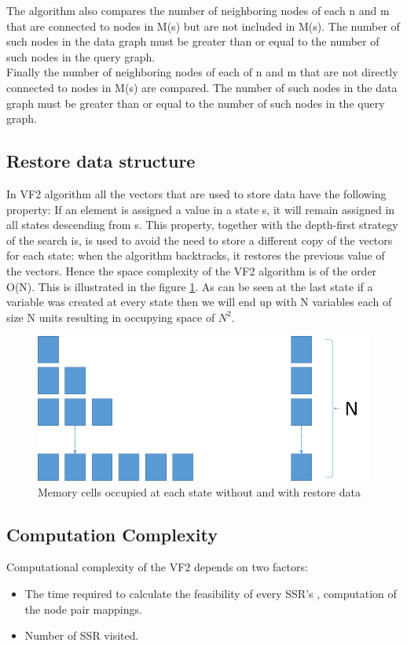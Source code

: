 The algorithm also compares the number of neighboring nodes of each n and m that are connected to nodes in M(s) but are not
included in M(s). The number of such nodes in the data graph must be greater than or equal to the number of such nodes in the query graph.\\

Finally the number of neighboring nodes of each of n and m that are not directly connected to nodes in M(s) are compared. The number of 
such nodes in the data graph must be greater than or equal to the number of such nodes in the query graph.

\subsection{Restore data structure}
In VF2 algorithm all the vectors that are used to store data have the following property: If an element is assigned a value in a state s, it will remain assigned in all states descending from s. This property, together with the depth-first strategy of the search is, is used to avoid the need to store a different copy of the vectors for each state: when the algorithm backtracks, it restores the previous value of the vectors. Hence the space complexity of the VF2 algorithm is of the order O(N). This is illustrated in the figure \ref{fig:memManagement}. As can be seen at the last state if a variable was created at every state then we will end up with N variables each of size N units resulting in occupying space of $N^2$.

\begin{figure}[!ht]
\includegraphics[scale=0.5]{./pics/memManagement.png}
\caption{Memory cells occupied at each state without and with restore data}
\label{fig:memManagement}
\centering
\end{figure}

\subsection{Computation Complexity}
Computational complexity of the VF2 depends on two factors: 
\begin{itemize}
\item The time required to calculate the feasibility of every SSR's , computation of the node pair mappings.
\item Number of SSR visited.
\end{itemize}

